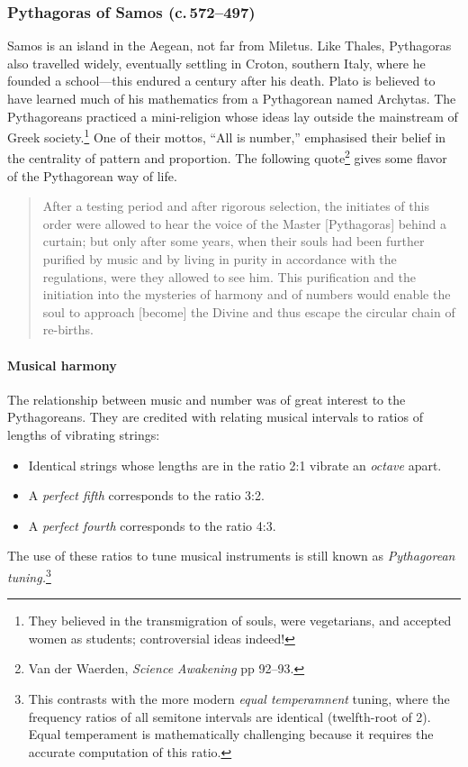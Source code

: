 \subsubsection*{Pythagoras of Samos (c.\,572--497\BC)}

Samos is an island in the Aegean, not far from Miletus. Like Thales, Pythagoras also travelled widely, eventually settling in Croton, southern Italy, where he founded a school---this endured a century after his death. Plato is believed to have learned much of his mathematics from a Pythagorean named Archytas.\smallbreak
The Pythagoreans practiced a mini-religion whose ideas lay outside the mainstream of Greek society.\footnote{%
	They believed in the transmigration of souls, were vegetarians, and accepted women as students; controversial ideas indeed!%
}
One of their mottos, ``All is number,'' emphasised their belief in the centrality of pattern and proportion. The following quote\footnote{%
	Van der Waerden, \emph{Science Awakening} pp 92--93.%
} gives some flavor of the Pythagorean way of life.
\begin{quote}
  After a testing period and after rigorous selection, the initiates of this order were allowed to hear the voice of the Master [Pythagoras] behind a curtain; but only after some years, when their souls had been further purified by music and by living in purity in accordance with the regulations, were they allowed to see him. This purification and the initiation into the mysteries of harmony and of numbers would enable the soul to approach [become] the Divine and thus escape the circular chain of re-births.
\end{quote}

\paragraph{Musical harmony}\label{pg:pythagtuning}

The relationship between music and number was of great interest to the Py\-thag\-or\-eans. They are credited with relating musical intervals to ratios of lengths of vibrating strings:
\begin{itemize}
  \item Identical strings whose lengths are in the ratio 2:1 vibrate an \emph{octave} apart.
  \item A \emph{perfect fifth} corresponds to the ratio 3:2.
  \item A \emph{perfect fourth} corresponds to the ratio 4:3.
\end{itemize}
The use of these ratios to tune musical instruments is still known as \emph{Pythagorean tuning.}\footnote{%
	This contrasts with the more modern \emph{equal temperamnent} tuning, where the frequency ratios of all semitone intervals are identical (twelfth-root of 2). Equal temperament is mathematically challenging because it requires the accurate computation of this ratio.
}


